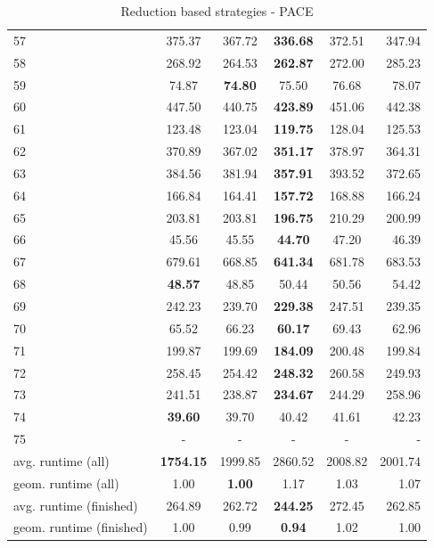\documentclass[a4paper,UKenglish,cleveref, autoref, thm-restate]{lipics-v2021}
\begin{document}
\begin{table}
\begin{center}
\begin{tabular}{|l| c| c| c| c| r|}
			57 & 375.37 & 367.72 & \textbf{336.68} & 372.51 & 347.94 \\
			58 & 268.92 & 264.53 & \textbf{262.87} & 272.00 & 285.23 \\
			59 & 74.87 & \textbf{74.80} & 75.50 & 76.68 & 78.07 \\
			60 & 447.50 & 440.75 & \textbf{423.89} & 451.06 & 442.38 \\
			61 & 123.48 & 123.04 & \textbf{119.75} & 128.04 & 125.53 \\
			62 & 370.89 & 367.02 & \textbf{351.17} & 378.97 & 364.31 \\
			63 & 384.56 & 381.94 & \textbf{357.91} & 393.52 & 372.65 \\
			64 & 166.84 & 164.41 & \textbf{157.72} & 168.88 & 166.24 \\
			65 & 203.81 & 203.81 & \textbf{196.75} & 210.29 & 200.99 \\
			66 & 45.56 & 45.55 & \textbf{44.70} & 47.20 & 46.39 \\
			67 & 679.61 & 668.85 & \textbf{641.34} & 681.78 & 683.53 \\
			68 & \textbf{48.57} & 48.85 & 50.44 & 50.56 & 54.42 \\
			69 & 242.23 & 239.70 & \textbf{229.38} & 247.51 & 239.35 \\
			70 & 65.52 & 66.23 & \textbf{60.17} & 69.43 & 62.96 \\
			71 & 199.87 & 199.69 & \textbf{184.09} & 200.48 & 199.84 \\
			72 & 258.45 & 254.42 & \textbf{248.32} & 260.58 & 249.93 \\
			73 & 241.51 & 238.87 & \textbf{234.67} & 244.29 & 258.96 \\
			74 & \textbf{39.60} & 39.70 & 40.42 & 41.61 & 42.23 \\
			75 & - & - & - & - & - \\
			\hline
			avg. runtime (all) & \textbf{1754.15} & 1999.85 & 2860.52 & 2008.82 & 2001.74 \\
			geom. runtime (all) & 1.00 & \textbf{1.00} & 1.17 & 1.03 & 1.07 \\
			avg. runtime (finished) & 264.89 & 262.72 & \textbf{244.25} & 272.45 & 262.85 \\
			geom. runtime (finished) & 1.00 & 0.99 & \textbf{0.94} & 1.02 & 1.00 \\
			\hline
		\end{tabular}
	\end{center}
	\caption{Reduction based strategies - PACE}
\end{table}
\end{document}
